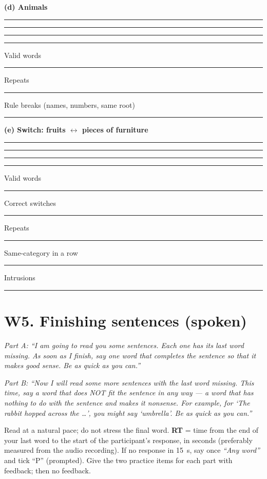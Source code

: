 \documentclass[10pt,a4paper]{article}
\newcommand{\blank}[1][1.2cm]{\rule{#1}{0.4pt}}
\begin{document}
\par{}\medskip\textbf{(d) Animals}\par\vspace{2pt}\blank[\linewidth]\par\vspace{9pt}\blank[\linewidth]\par\vspace{9pt}\blank[\linewidth]\par\vspace{9pt}\blank[\linewidth]\par\vspace{9pt}
Valid words \blank\quad Repeats \blank\quad Rule breaks (names, numbers, same root) \blank\par
\par{}\medskip\textbf{(e) Switch: fruits $\leftrightarrow$ pieces of furniture}\par\vspace{2pt}\blank[\linewidth]\par\vspace{9pt}\blank[\linewidth]\par\vspace{9pt}\blank[\linewidth]\par\vspace{9pt}\blank[\linewidth]\par\vspace{9pt}
Valid words \blank\quad Correct switches \blank\quad Repeats \blank\quad Same-category in a row \blank\quad Intrusions \blank\par
\section*{W5. Finishing sentences (spoken)}
\textit{Part A: ``I am going to read you some sentences. Each one has its last word missing. As soon as I finish, say one word that completes the sentence so that it makes good sense. Be as quick as you can.''}

\textit{Part B: ``Now I will read some more sentences with the last word missing. This time, say a word that does NOT fit the sentence in any way --- a word that has nothing to do with the sentence and makes it nonsense. For example, for `The rabbit hopped across the \ldots', you might say `umbrella'. Be as quick as you can.''}

Read at a natural pace; do not stress the final word. \textbf{RT} = time from the end of your last word to the start of the participant's response, in seconds (preferably measured from the audio recording). If no response in 15~s, say once \textit{``Any word''} and tick ``P'' (prompted). Give the two practice items for each part with feedback; then no feedback.
\end{document}
